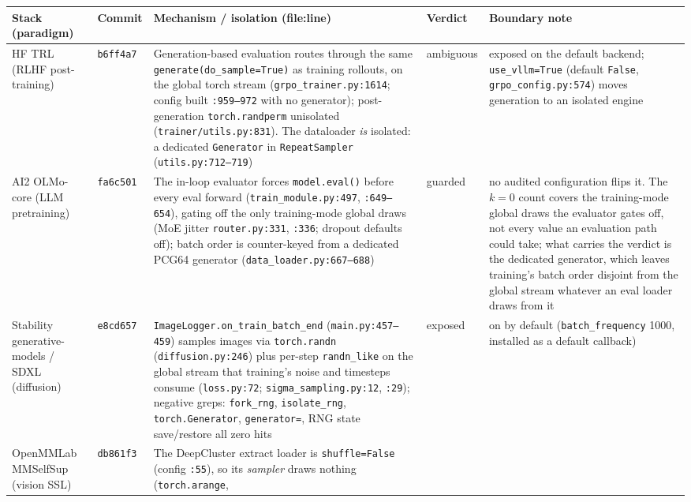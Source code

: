 \documentclass[10pt,letterpaper]{article}
\theoremstyle{remark}
\newcommand{\code}[1]{\texttt{#1}}
\begin{document}
\begin{table}[tbp]
\centering
\footnotesize
\setlength{\tabcolsep}{4pt}
\begin{tabular}{@{}L{2.3cm}L{1.15cm}L{6.55cm}L{1.35cm}L{3.6cm}@{}}
\toprule
Stack (paradigm) & Commit & Mechanism / isolation (file:line) & Verdict &
Boundary note \\
\midrule
HF TRL (RLHF post-training) & \code{b6ff4a7} &
Generation-based evaluation routes through the same
\code{generate(do\_sample=True)} as training rollouts, on the global
torch stream (\code{grpo\_trainer.py:1614}; config built \code{:959--972}
with no generator); post-generation \code{torch.randperm} unisolated
(\code{trainer/utils.py:831}). The dataloader \emph{is} isolated: a
dedicated \code{Generator} in \code{RepeatSampler}
(\code{utils.py:712--719}) &
ambiguous &
exposed on the default backend; \code{use\_vllm=True}
(default \code{False}, \code{grpo\_config.py:574}) moves generation to
an isolated engine \\
\addlinespace
AI2 OLMo-core (LLM pretraining) & \code{fa6c501} &
The in-loop evaluator forces \code{model.eval()} before every eval
forward (\code{train\_module.py:497}, \code{:649--654}), gating off the
only training-mode global draws (MoE jitter \code{router.py:331},
\code{:336}; dropout defaults off); batch order is counter-keyed from a
dedicated PCG64 generator (\code{data\_loader.py:667--688}) &
guarded &
no audited configuration flips it. The $k = 0$ count covers the training-mode
global draws the evaluator gates off, not every value an evaluation path
could take; what carries the verdict is the dedicated generator, which
leaves training's batch order disjoint from the global stream whatever an
eval loader draws from it \\
\addlinespace
Stability generative-models / SDXL (diffusion) & \code{e8cd657} &
\code{ImageLogger.on\_train\_batch\_end} (\code{main.py:457--459})
samples images via \code{torch.randn} (\code{diffusion.py:246}) plus
per-step \code{randn\_like} on the global stream that training's noise
and timesteps consume (\code{loss.py:72};
\code{sigma\_sampling.py:12}, \code{:29}); negative greps:
\code{fork\_rng}, \code{isolate\_rng}, \code{torch.Generator},
\code{generator=}, RNG state save/restore all zero hits &
exposed &
on by default (\code{batch\_frequency} 1000, installed as a default
callback) \\
\addlinespace
OpenMMLab MMSelfSup (vision SSL) & \code{db861f3} &
The DeepCluster extract loader is \code{shuffle=False}
(config \code{:55}), so its \emph{sampler} draws nothing (\code{torch.arange},

\end{tabular}
\end{table}
\end{document}

